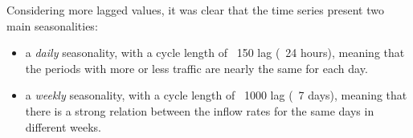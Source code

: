 Considering more lagged values, it was clear that the time series present two main seasonalities:
\begin{itemize}
  \item a \emph{daily} seasonality, with a cycle length of ~150 lag (~24 hours), meaning that the periods with more or less traffic are nearly the same for each day.
  \item a \emph{weekly} seasonality, with a cycle length of ~1000 lag (~7 days), meaning that there is a strong relation between the inflow rates for the same days in different weeks.
\end{itemize}


\clearpage